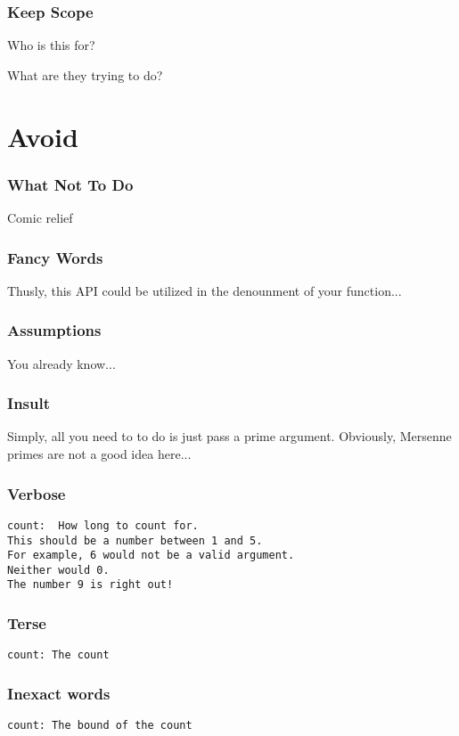 \begin{frame}
\frametitle{Keep Scope}

Who is this for?

What are they trying to do?
\end{frame}

\section{Avoid}

\begin{frame}
\frametitle{What Not To Do}

Comic relief
\end{frame}

\begin{frame}
\frametitle{Fancy Words}

Thusly, this API could be utilized in the denounment of your function...
\end{frame}

\begin{frame}
\frametitle{Assumptions}

You already know...
\end{frame}

\begin{frame}
\frametitle{Insult}

Simply, all you need to to do is just pass a prime argument.
Obviously, Mersenne primes are not a good idea here...
\end{frame}

\begin{frame}[fragile]
\frametitle{Verbose}

\begin{lstlisting}
count:  How long to count for.
This should be a number between 1 and 5.
For example, 6 would not be a valid argument.
Neither would 0.
The number 9 is right out!
\end{lstlisting}
\end{frame}

\begin{frame}[fragile]
\frametitle{Terse}

\begin{lstlisting}
count: The count
\end{lstlisting}
\end{frame}

\begin{frame}
\frametitle{Inexact words}

\begin{lstlisting}
count: The bound of the count
\end{lstlisting}

\end{frame}

